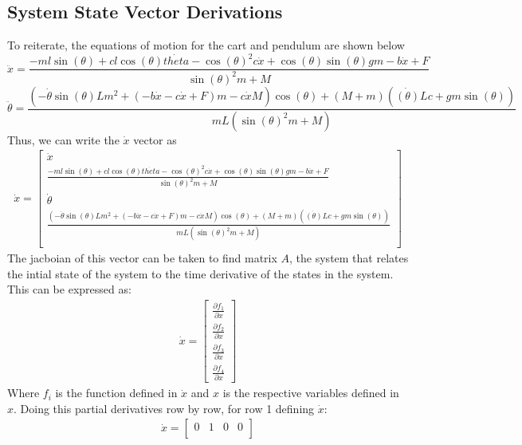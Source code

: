 \documentclass{article}
\begin{document}
\subsection{System State Vector Derivations}
To reiterate, the equations of motion for the cart and pendulum are shown below
\[\ddot{x}=\frac{-ml\sin{(\theta)}+cl\cos{(\theta)}\dot{theta}-\cos{(\theta)}^2c\dot{x}+\cos{(\theta)}\sin{(\theta)}gm-b\dot{x}+F}{\sin{(\theta)}^2m+M}\]
\[\ddot{\theta}=\frac{(-\dot{\theta}\sin{(\theta)}Lm^2+(-b\dot{x}-c\dot{x}+F)m-c\dot{x}M)\cos{(\theta)}+(M+m)(\dot{(\theta)}Lc+gm\sin{(\theta)})}{mL(\sin{(\theta)}^2m+M)}\]
Thus, we can write the $\dot{x}$ vector as 
\begin{align*}
    \dot{x} = \begin{bmatrix}
        \dot{x}\\
        \frac{-ml\sin{(\theta)}+cl\cos{(\theta)}\dot{theta}-\cos{(\theta)}^2c\dot{x}+\cos{(\theta)}\sin{(\theta)}gm-b\dot{x}+F}{\sin{(\theta)}^2m+M}\\
        \dot{\theta}\\
        \frac{(-\dot{\theta}\sin{(\theta)}Lm^2+(-b\dot{x}-c\dot{x}+F)m-c\dot{x}M)\cos{(\theta)}+(M+m)(\dot{(\theta)}Lc+gm\sin{(\theta)})}{mL(\sin{(\theta)}^2m+M)}\\
    \end{bmatrix}
\end{align*}
The jacboian of this vector can be taken to find matrix $A$, the system that relates the intial state of the system
to the time derivative of the states in the system. This can be expressed as: 
\begin{align*}
    \dot{x} = \begin{bmatrix}
        \frac{\partial f_1}{\partial x}\\
        \frac{\partial f_2}{\partial x}\\
        \frac{\partial f_3}{\partial x}\\
        \frac{\partial f_4}{\partial x}
    \end{bmatrix}
\end{align*}
Where $f_i$ is the function defined in $\dot{x}$ and $x$ is the respective variables defined in $x$. Doing
this partial derivatives row by row, for row 1 defining $\dot{x}$:
\begin{align*}
    \dot{x} = \begin{bmatrix}
        0 & 1 & 0 & 0\\
    \end{bmatrix}
\end{align*}
\end{document}

